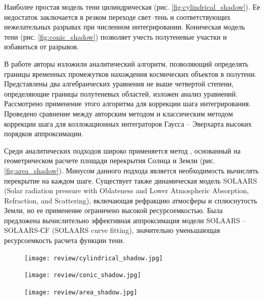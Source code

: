 Наиболее простая модель тени цилиндрическая (рис. \ref{fig:cylindrical_shadow}). Ее недостаток заключается в резком переходе
свет--тень и соответствующих нежелательных разрывах при численном интегрировании.
Коническая модель тени (рис. \ref{fig:conic_shadow}) позволяет учесть полутеневые участки и избавиться от разрывов.

В работе \cite{kuznetsov2024} авторы изложили аналитический алгоритм, позволяющий определять границы временных промежутков нахождения космических объектов в полутени. Представлены
два алгебраических уравнения не выше четвертой степени, определяющие границы полутеневых областей, изложен анализ уравнений. Рассмотрено применение этого
алгоритма для коррекции шага интегрирования. Проведено сравнение между авторским методом и классическим методом коррекции шага для коллокационных интеграторов
Гаусса – Эверхарта высоких порядков аппроксимации.

Среди аналитических подходов широко применяется метод \cite{zhang2019}, основанный на геометрическом
расчете площади перекрытия Солнца и Земли (рис. \ref{fig:area_shadow}). Минусом данного подхода является необходимость
вычислять перекрытие на каждом шаге. 
Существует также динамическая модель SOLAARS 
(Solar radiation pressure with Oblateness and Lower Atmospheric Absorption, Refraction, and Scattering), включающая рефракцию атмосферы и
сплюснутость Земли, но ее применение ограничено высокой ресурсоемкостью. Была предложена
вычислительно эффективная аппроксимация модели SOLAARS -- SOLAARS-СF (SOLAARS curve fitting), значительно уменьшающая
ресурсоемкость расчета функции тени.

\begin{figure}[ht]
  \begin{minipage}[c]{0.68\textwidth}
    \centering
    \texttt{[image: review/cylindrical\_shadow.jpg]}
    \label{fig:cylindrical_shadow}
    
    \vspace{0.5cm} %
    
    \texttt{[image: review/conic\_shadow.jpg]}
    \label{fig:conic_shadow}
  \end{minipage}
  \hfill
  \begin{minipage}[c]{0.3\textwidth}
    \centering
    \texttt{[image: review/area\_shadow.jpg]}
    \label{fig:area_shadow}
  \end{minipage}

  \label{fig:combined}
\end{figure}


